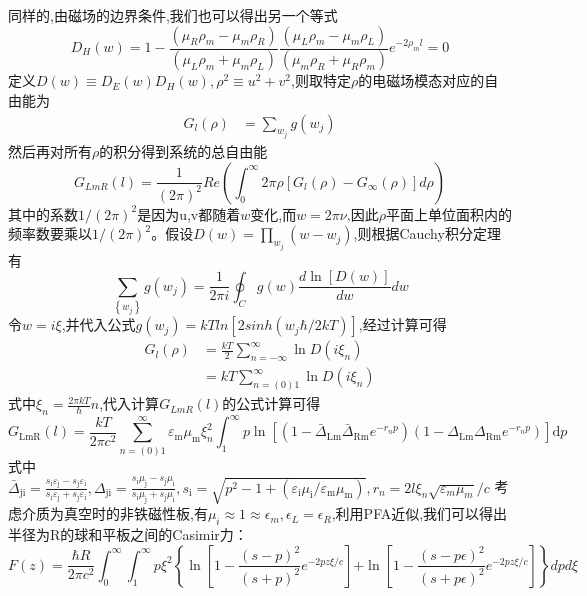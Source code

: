 同样的,由磁场的边界条件,我们也可以得出另一个等式
$$
D_H (w)=1-\frac{\left( \mu _R\rho _m-\mu _m\rho _R \right)}{\left( \mu _L\rho _m+\mu _m\rho _L \right)}\frac{\left( \mu _L\rho _m-\mu _m\rho _L \right)}{\left( \mu _m\rho _R+\mu _R\rho _m \right)}e^{-2\rho _ml}=0
$$
定义$D(w) \equiv D_E(w)D_H(w),\rho^2 \equiv u^2+v^2$,则取特定$\rho$的电磁场模态对应的自由能为
\begin{equation*}
\begin{split}
G_l(\rho)&=\sum_{{w_j}}g{(w_j)}
\end{split}
\end{equation*}
然后再对所有$\rho$的积分得到系统的总自由能
$$
G_{LmR}(l)=\frac{1}{(2\pi)^2}Re({\int_{0}^{\infty}2\pi \rho[G_l(\rho)-G_{\infty}(\rho)]d\rho})
$$
其中的系数$1/{(2π)}^2$是因为u,v都随着$w$变化,而$w=2π\nu$,因此$\rho$平面上单位面积内的频率数要乘以$1/{(2π)}^2$。假设$D(w)=\prod_{{w_j}}(w-w_j)$,则根据Cauchy积分定理有
$$
\sum_{\left\{ w_j \right\}}{g\left( w_j \right)}=\frac{1}{2\pi i}\oint_C{g\left( w \right) \frac{d\ln \left[ D\left( w \right) \right]}{dw}dw}
$$
令$w=i\xi $,并代入公式$g(w_j) =kTln[2sinh(w_j\hbar/2kT)]$,经过计算可得
\begin{equation*}
\begin{split}
G_l(\rho)&=\frac{kT}{2}\sum_{n=-\infty}^{\infty}{\ln D\left( i\xi _n \right)}\\
&=kT\sum_{n=(0)1}^{\infty}{\ln D\left( i\xi _n \right)}
\end{split}
\end{equation*}
式中$\xi_n=\frac{2\pi kT}{\hbar}n$,代入计算$G_{LmR}(l)$的公式计算可得
$$G_{\mathrm{LmR}}(l)=\frac{k T}{2 \pi c^{2}} \sum_{n=(0)1}^{\infty} \varepsilon_{\mathrm{m}} \mu_{\mathrm{m}} \xi_{n}^{2} \int_{1}^{\infty} p \ln \left[\left(1-\bar{\Delta}_{\mathrm{Lm}} \bar{\Delta}_{\mathrm{Rm}} e^{-r_{n} p}\right)\left(1-\Delta_{\mathrm{Lm}} \Delta_{\mathrm{Rm}} e^{-r_{n} p}\right)\right] \mathrm{d} p$$
式中$\bar{\Delta}_{\mathrm{ji}}=\frac{s_{\mathrm{i}} \varepsilon_{\mathrm{j}}-s_{\mathrm{j}} \varepsilon_{\mathrm{i}}}{s_{\mathrm{i}} \varepsilon_{\mathrm{j}}+s_{\mathrm{j}} \varepsilon_{\mathrm{i}}},\Delta_{\mathrm{ji}}=\frac{s_{\mathrm{i}} \mu_{\mathrm{j}}-s_{\mathrm{j}} \mu_{\mathrm{i}}}{s_{\mathrm{i}} \mu_{\mathrm{j}}+s_{\mathrm{j}} \mu_{\mathrm{i}}},s_{\mathrm{i}}=\sqrt{p^{2}-1+\left(\varepsilon_{\mathrm{i}} \mu_{\mathrm{i}} / \varepsilon_{\mathrm{m}} \mu_{\mathrm{m}}\right)},r_n = 2l\xi_n\sqrt{\varepsilon_m\mu_m}/c$
考虑介质为真空时的非铁磁性板,有$\mu_{i} \approx 1 \approx \epsilon_{m}, \epsilon_{L}=\epsilon_{R}$,利用PFA近似\cite{Derjaguin_1956,Blocki_1977},我们可以得出半径为R的球和平板之间的Casimir力：
$$
F(z)= \frac{\hbar R}{2 \pi c^{2}} \int_{0}^{\infty} \int_{1}^{\infty} p \xi^{2}\left\{\ln \left[1-\frac{(s-p)^{2}}{(s+p)^{2}} e^{-2 p z \xi / c}\right]\right. \left.+\ln \left[1-\frac{(s-p \epsilon)^{2}}{(s+p \epsilon)^{2}} e^{-2 p z \xi / c}\right]\right\} d p d \xi 
$$




